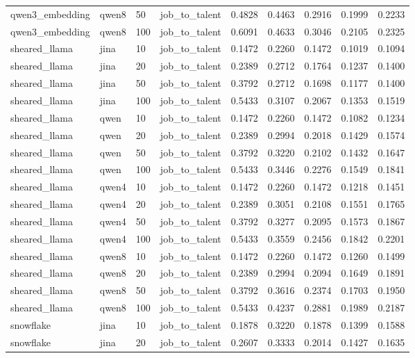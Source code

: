 \begin{table}[t]
\begin{tabular}{lllllllll}
qwen3_embedding & qwen8 & 50 & job_to_talent & 0.4828 & 0.4463 & 0.2916 & 0.1999 & 0.2233 \\
qwen3_embedding & qwen8 & 100 & job_to_talent & 0.6091 & 0.4633 & 0.3046 & 0.2105 & 0.2325 \\
sheared_llama & jina & 10 & job_to_talent & 0.1472 & 0.2260 & 0.1472 & 0.1019 & 0.1094 \\
sheared_llama & jina & 20 & job_to_talent & 0.2389 & 0.2712 & 0.1764 & 0.1237 & 0.1400 \\
sheared_llama & jina & 50 & job_to_talent & 0.3792 & 0.2712 & 0.1698 & 0.1177 & 0.1400 \\
sheared_llama & jina & 100 & job_to_talent & 0.5433 & 0.3107 & 0.2067 & 0.1353 & 0.1519 \\
sheared_llama & qwen & 10 & job_to_talent & 0.1472 & 0.2260 & 0.1472 & 0.1082 & 0.1234 \\
sheared_llama & qwen & 20 & job_to_talent & 0.2389 & 0.2994 & 0.2018 & 0.1429 & 0.1574 \\
sheared_llama & qwen & 50 & job_to_talent & 0.3792 & 0.3220 & 0.2102 & 0.1432 & 0.1647 \\
sheared_llama & qwen & 100 & job_to_talent & 0.5433 & 0.3446 & 0.2276 & 0.1549 & 0.1841 \\
sheared_llama & qwen4 & 10 & job_to_talent & 0.1472 & 0.2260 & 0.1472 & 0.1218 & 0.1451 \\
sheared_llama & qwen4 & 20 & job_to_talent & 0.2389 & 0.3051 & 0.2108 & 0.1551 & 0.1765 \\
sheared_llama & qwen4 & 50 & job_to_talent & 0.3792 & 0.3277 & 0.2095 & 0.1573 & 0.1867 \\
sheared_llama & qwen4 & 100 & job_to_talent & 0.5433 & 0.3559 & 0.2456 & 0.1842 & 0.2201 \\
sheared_llama & qwen8 & 10 & job_to_talent & 0.1472 & 0.2260 & 0.1472 & 0.1260 & 0.1499 \\
sheared_llama & qwen8 & 20 & job_to_talent & 0.2389 & 0.2994 & 0.2094 & 0.1649 & 0.1891 \\
sheared_llama & qwen8 & 50 & job_to_talent & 0.3792 & 0.3616 & 0.2374 & 0.1703 & 0.1950 \\
sheared_llama & qwen8 & 100 & job_to_talent & 0.5433 & 0.4237 & 0.2881 & 0.1989 & 0.2187 \\
snowflake & jina & 10 & job_to_talent & 0.1878 & 0.3220 & 0.1878 & 0.1399 & 0.1588 \\
snowflake & jina & 20 & job_to_talent & 0.2607 & 0.3333 & 0.2014 & 0.1427 & 0.1635 \\

\end{tabular}
\end{table}
